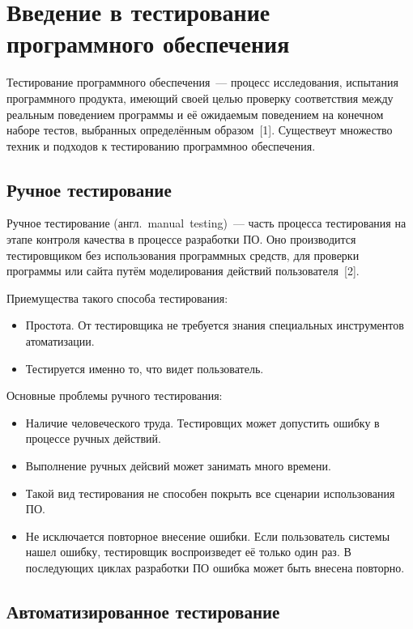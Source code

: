 \section{Введение в тестирование программного обеспечения} \label{section_1}

Тестирование программного обеспечения~--- процесс исследования, испытания программного продукта, имеющий своей целью проверку соответствия между реальным поведением программы и её ожидаемым поведением на конечном наборе тестов, выбранных определённым образом~[1]. Существеут множество техник и подходов к тестированию программноо обеспечения.  

\subsection{Ручное тестирование} \label{subsection_11}

Ручное тестирование (англ.~manual~testing)~--- часть процесса тестирования на этапе контроля качества в процессе разработки ПО. Оно производится тестировщиком без использования программных средств, для проверки программы или сайта путём моделирования действий пользователя~[2]. 

Приемущества такого способа тестирования:

\begin{itemize}
	\item Простота. От тестировщика не требуется знания специальных инструментов атоматизации.
	\item Тестируется именно то, что видет пользователь.
\end{itemize} 

Основные проблемы ручного тестирования:
\begin{itemize}
	\item Наличие человеческого труда. Тестировщих может допустить ошибку в процессе ручных действий.
	\item Выполнение ручных дейсвий может занимать много времени.
	\item Такой вид тестирования не способен покрыть все сценарии использования ПО. 
	\item Не исключается повторное внесение ошибки. Если пользователь системы нашел ошибку, тестировщик воспроизведет её только один раз. В последующих циклах разработки ПО ошибка может быть внесена повторно.
\end{itemize} 


\subsection{Автоматизированное тестирование} \label{subsection_12}
 
